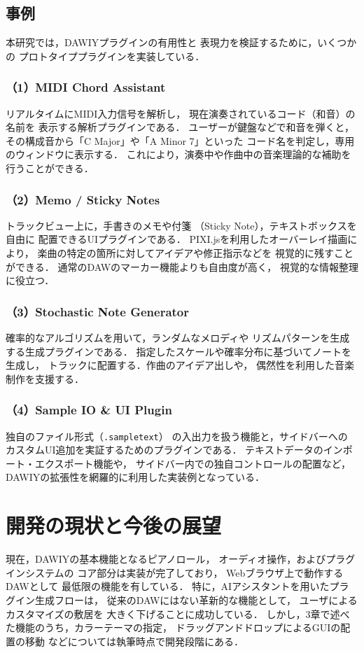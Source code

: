 \subsection{事例}
本研究では，DAWIYプラグインの有用性と
表現力を検証するために，いくつかの
プロトタイププラグインを実装している．

\subsubsection*{（1）MIDI Chord Assistant}
リアルタイムにMIDI入力信号を解析し，
現在演奏されているコード（和音）の名前を
表示する解析プラグインである．
ユーザーが鍵盤などで和音を弾くと，
その構成音から「C Major」や「A Minor 7」といった
コード名を判定し，専用のウィンドウに表示する．
これにより，演奏中や作曲中の音楽理論的な補助を
行うことができる．

\subsubsection*{（2）Memo / Sticky Notes}
トラックビュー上に，手書きのメモや付箋
（Sticky Note），テキストボックスを自由に
配置できるUIプラグインである．
PIXI.jsを利用したオーバーレイ描画により，
楽曲の特定の箇所に対してアイデアや修正指示などを
視覚的に残すことができる．
通常のDAWのマーカー機能よりも自由度が高く，
視覚的な情報整理に役立つ．

\subsubsection*{（3）Stochastic Note Generator}
確率的なアルゴリズムを用いて，ランダムなメロディや
リズムパターンを生成する生成プラグインである．
指定したスケールや確率分布に基づいてノートを生成し，
トラックに配置する．作曲のアイデア出しや，
偶然性を利用した音楽制作を支援する．

\subsubsection*{（4）Sample IO \& UI Plugin}
独自のファイル形式（\texttt{.sampletext}）
の入出力を扱う機能と，サイドバーへの
カスタムUI追加を実証するためのプラグインである．
テキストデータのインポート・エクスポート機能や，
サイドバー内での独自コントロールの配置など，
DAWIYの拡張性を網羅的に利用した実装例となっている．

\section{開発の現状と今後の展望}
現在，DAWIYの基本機能となるピアノロール，
オーディオ操作，およびプラグインシステムの
コア部分は実装が完了しており，
Webブラウザ上で動作するDAWとして
最低限の機能を有している．
特に，AIアシスタントを用いたプラグイン生成フローは，
従来のDAWにはない革新的な機能として，
ユーザによるカスタマイズの敷居を
大きく下げることに成功している．
しかし，3章で述べた機能のうち，カラーテーマの指定，
ドラッグアンドドロップによるGUIの配置の移動
などについては執筆時点で開発段階にある．


